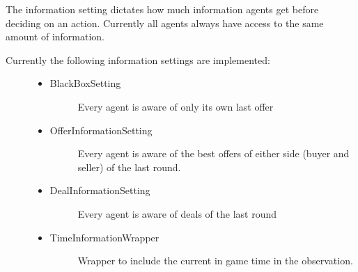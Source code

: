 \documentclass[letterpaper,10pt,english]{sphinxmanual}
\begin{document}
\sphinxAtStartPar
The information setting dictates how much information agents get before deciding on an action. Currently all agents
always have access to the same amount of information.
\begin{description}
\item[{Currently the following information settings are implemented:}] \leavevmode\begin{itemize}
\item {} \begin{description}
\item[{BlackBoxSetting}] \leavevmode
\sphinxAtStartPar
Every agent is aware of only its own last offer

\end{description}

\item {} \begin{description}
\item[{OfferInformationSetting}] \leavevmode
\sphinxAtStartPar
Every agent is aware of the best  offers of either side (buyer and seller) of the last
round.

\end{description}

\item {} \begin{description}
\item[{DealInformationSetting}] \leavevmode
\sphinxAtStartPar
Every agent is aware of  deals of the last round

\end{description}

\item {} \begin{description}
\item[{TimeInformationWrapper}] \leavevmode
\sphinxAtStartPar
Wrapper to include the current in game time in the observation.

\end{description}

\end{itemize}

\end{description}

\sphinxAtStartPar
{}
\end{document}
